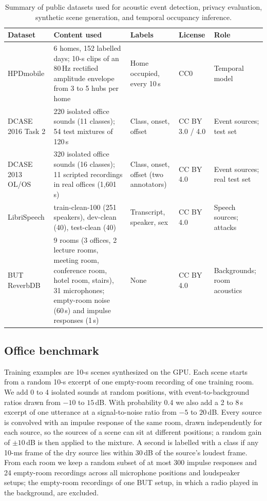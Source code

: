 \documentclass[11pt]{article}
\begin{document}
\begin{table}[t]
\centering\small
\caption{Summary of public datasets used for acoustic event detection, privacy evaluation, synthetic scene generation, and temporal occupancy inference.}
\label{tab:data}
\begin{tabular}{@{}L{2.6cm}L{5.2cm}L{2.6cm}L{1.6cm}L{2.4cm}@{}}
\toprule
Dataset & Content used & Labels & License & Role \\
\midrule
HPDmobile \citep{jacoby2021hpdmobile} & 6 homes, 152 labelled days; 10-s clips of an 80\,Hz rectified amplitude envelope from 3 to 5 hubs per home & Home occupied, every 10\,s & CC0 & Temporal model \\
DCASE 2016 Task 2 \citep{lafay2017dcase2016} & 220 isolated office sounds (11 classes); 54 test mixtures of 120\,s & Class, onset, offset & CC BY 3.0 / 4.0 & Event sources; test set \\
DCASE 2013 OL/OS \citep{stowell2015dcase} & 320 isolated office sounds (16 classes); 11 scripted recordings in real offices (1,601\,s) & Class, onset, offset (two annotators) & CC BY 4.0 & Event sources; real test set \\
LibriSpeech \citep{panayotov2015librispeech} & train-clean-100 (251 speakers), dev-clean (40), test-clean (40) & Transcript, speaker, sex & CC BY 4.0 & Speech sources; attacks \\
BUT ReverbDB \citep{szoke2019but} & 9 rooms (3 offices, 2 lecture rooms, meeting room, conference room, hotel room, stairs), 31 microphones; empty-room noise (60\,s) and impulse responses (1\,s) & None & CC BY 4.0 & Backgrounds; room acoustics \\
\bottomrule
\end{tabular}
\end{table}

\subsection{Office benchmark}
\label{sec:office}
Training examples are 10-s scenes synthesized on the GPU. Each scene starts from a random 10-s excerpt of one empty-room recording of one training room. We add 0 to 4 isolated sounds at random positions, with event-to-background ratios drawn from $-10$ to $15$\,dB. With probability 0.4 we also add a 2 to 8\,s excerpt of one utterance at a signal-to-noise ratio from $-5$ to $20$\,dB. Every source is convolved with an impulse response of the same room, drawn independently for each source, so the sources of a scene can sit at different positions; a random gain of $\pm10$\,dB is then applied to the mixture. A second is labelled with a class if any 10-ms frame of the dry source lies within 30\,dB of the source's loudest frame. From each room we keep a random subset of at most 300 impulse responses and 24 empty-room recordings across all microphone positions and loudspeaker setups; the empty-room recordings of one BUT setup, in which a radio played in the background, are excluded.
\end{document}

